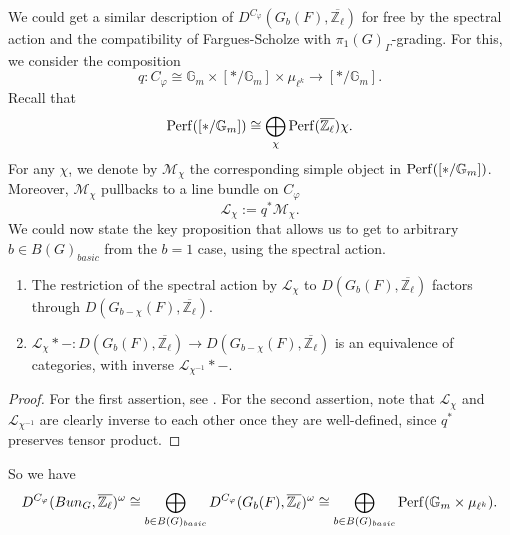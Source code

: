 We could get a similar description of $D^{C_{\varphi}}(G_b(F), \overline{\mathbb{Z}_{\ell}})$ for free by the spectral action and the compatibility of Fargues-Scholze with $\pi_1(G)_{\Gamma}$-grading. For this, we consider the composition
$$q: C_{\varphi} \cong \mathbb{G}_m \times [*/\mathbb{G}_m] \times \mu_{\ell^k} \to [*/\mathbb{G}_m].$$
Recall that 
$$\operatorname{\operatorname{Perf}}([*/\mathbb{G}_m]) \cong \bigoplus_{\chi}\operatorname{\operatorname{Perf}}(\overline{\mathbb{Z}_{\ell}})\chi.$$
For any $\chi$, we denote by $\mathcal{M}_{\chi}$ the corresponding simple object in $\operatorname{\operatorname{Perf}}([*/\mathbb{G}_m])$. Moreover, $\mathcal{M}_{\chi}$ pullbacks to a line bundle on $C_{\varphi}$
$$\mathcal{L}_{\chi}:=q^*\mathcal{M}_{\chi}.$$
We could now state the key proposition that allows us to get to arbitrary $b \in B(G)_{basic}$ from the $b=1$ case, using the spectral action.
\begin{proposition}\label{Prop Spectral action}
	\begin{enumerate}
		\item The restriction of the spectral action by $\mathcal{L}_{\chi}$ to $D(G_b(F), \overline{\mathbb{Z}_{\ell}})$ factors through $D(G_{b-\chi}(F), \overline{\mathbb{Z}_{\ell}})$.
		
		\item $\mathcal{L}_{\chi}*-: D(G_b(F), \overline{\mathbb{Z}_{\ell}}) \to D(G_{b-\chi}(F), \overline{\mathbb{Z}_{\ell}})$ is an equivalence of categories, with inverse $\mathcal{L}_{\chi^{-1}}*-$.
	\end{enumerate}
\end{proposition}

\begin{proof}
	For the first assertion, see \cite[Lemma 5.3.2]{zou2022categorical}. For the second assertion, note that $\mathcal{L}_{\chi}$ and $\mathcal{L}_{\chi^{-1}}$ are clearly inverse to each other once they are well-defined, since $q^*$ preserves tensor product.
\end{proof}
So we have 
$$D^{C_{\varphi}}(Bun_G, \overline{\mathbb{Z}_{\ell}})^{\omega} \cong \bigoplus_{b \in B(G)_{basic}}D^{C_{\varphi}}(G_b(F), \overline{\mathbb{Z}_{\ell}})^{\omega} \cong \bigoplus_{b \in B(G)_{basic}}\operatorname{\operatorname{Perf}}(\mathbb{G}_m \times \mu_{\ell^k}).$$

